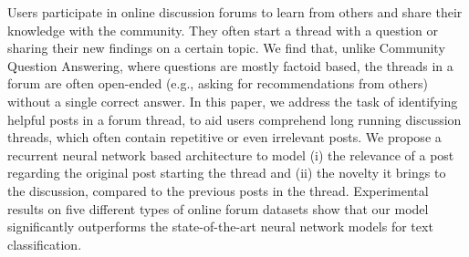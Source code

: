 Users participate in online discussion forums to learn from others and share their knowledge with the community. They often start a thread with a question or sharing their new findings on a certain topic. We find that, unlike Community Question Answering, where questions are mostly factoid based, the threads in a forum are often open-ended (e.g., asking for recommendations from others) without a single correct answer. In this paper, we address the task of identifying helpful posts in a forum thread, to aid users comprehend long running discussion threads, which often contain repetitive or even irrelevant posts. We propose a recurrent neural network based architecture to model (i) the relevance of a post regarding the original post starting the thread and (ii) the novelty it brings to the discussion, compared to the previous posts in the thread. Experimental results on five different types of online forum datasets show that our model significantly outperforms the state-of-the-art neural network models for text classification.
